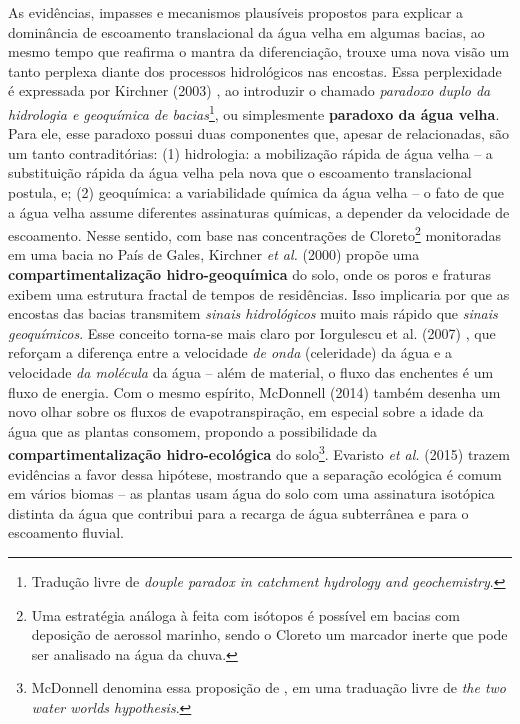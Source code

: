 \documentclass[./main.tex]{subfiles}
\begin{document}
\par As evidências, impasses e mecanismos plausíveis propostos para explicar a dominância de escoamento translacional da água velha em algumas bacias, ao mesmo tempo que reafirma o mantra da diferenciação, trouxe uma nova visão um tanto perplexa diante dos processos hidrológicos nas encostas. Essa perplexidade é expressada por Kirchner (2003) \cite{Kirchner2003}, ao introduzir o chamado \textit{paradoxo duplo da hidrologia e geoquímica de bacias}\footnote{Tradução livre de \textit{douple paradox in catchment hydrology and geochemistry}.}, ou simplesmente \textbf{paradoxo da água velha}. Para ele, esse paradoxo possui duas componentes que, apesar de relacionadas, são um tanto contraditórias: (1) hidrologia: a mobilização rápida de água velha -- a substituição rápida da água velha pela nova que o escoamento translacional postula, e; (2) geoquímica: a variabilidade química da água velha -- o fato de que a água velha assume diferentes assinaturas químicas, a depender da velocidade de escoamento. Nesse sentido, com base nas concentrações de Cloreto\footnote{Uma estratégia análoga à feita com isótopos é possível em bacias com deposição de aerossol marinho, sendo o Cloreto um marcador inerte que pode ser analisado na água da chuva.} monitoradas em uma bacia no País de Gales, Kirchner \textit{et al.} (2000) \cite{kirchner2000} propõe uma \textbf{compartimentalização hidro-geoquímica} do solo, onde os poros e fraturas exibem uma estrutura fractal de tempos de residências. Isso implicaria por que as encostas das bacias transmitem \textit{sinais hidrológicos} muito mais rápido que \textit{sinais geoquímicos}. Esse conceito torna-se mais claro por Iorgulescu et al. (2007) \cite{Iorgulescu2007}, que reforçam a diferença entre a velocidade \textit{de onda} (celeridade) da água e a velocidade \textit{da molécula} da água -- além de material, o fluxo das enchentes é um fluxo de energia. Com o mesmo espírito, McDonnell (2014) \cite{mcdonnell2014} também desenha um novo olhar sobre os fluxos de evapotranspiração, em especial sobre a idade da água que as plantas consomem, propondo a possibilidade da \textbf{compartimentalização hidro-ecológica} do solo\footnote{McDonnell denomina essa proposição de , em uma traduação livre de \textit{the two water worlds hypothesis}.}. Evaristo \textit{et al.} (2015) \cite{Evaristo2015} trazem evidências a favor dessa hipótese, mostrando que a separação ecológica é comum em vários biomas -- as plantas usam água do solo com uma assinatura isotópica distinta da água que contribui para a recarga de água subterrânea e para o escoamento fluvial.
\end{document}
